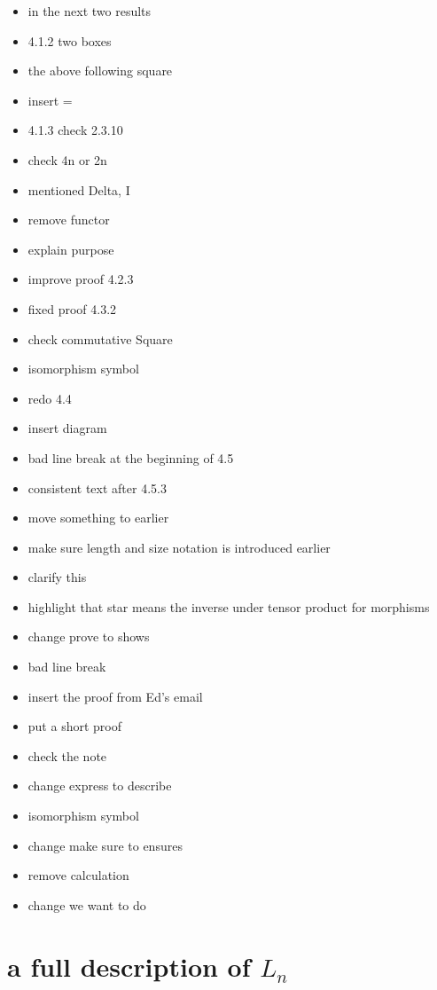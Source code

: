 \documentclass{amsart}
\begin{document}
\begin{itemize}
\item in the next two results
\item 4.1.2 two boxes
\item the above following square
\item insert =
\item 4.1.3 check 2.3.10
\item check 4n or 2n
\item mentioned Delta, I
\item remove functor
\item explain purpose
\item improve proof 4.2.3
\item fixed proof 4.3.2
\item check commutative Square
\item isomorphism symbol
\item redo 4.4
\item insert diagram
\item bad line break at the beginning of 4.5
\item consistent text after 4.5.3
\item move something to earlier
\item make sure length and size notation is introduced earlier
\item clarify this
\item highlight that star means the inverse under tensor product for morphisms
\item change prove to shows
\item bad line break
\item insert the proof from Ed's email
\item put a short proof
\item check the note
\item change express to describe
\item isomorphism symbol
\item change make sure to ensures
\item remove calculation
\item change we want to do
\end{itemize}



\section{a full description of $L_n $}
\end{document}

